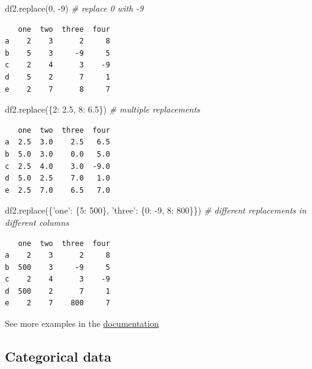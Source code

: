 \documentclass[
  letterpaper,
]{scrbook}
\newenvironment{Shaded}{\begin{snugshade}}{\end{snugshade}}
\newcommand{\CommentTok}[1]{\textcolor[rgb]{0.56,0.35,0.01}{\textit{#1}}}
\newcommand{\DecValTok}[1]{\textcolor[rgb]{0.00,0.00,0.81}{#1}}
\newcommand{\FloatTok}[1]{\textcolor[rgb]{0.00,0.00,0.81}{#1}}
\newcommand{\NormalTok}[1]{#1}
\newcommand{\StringTok}[1]{\textcolor[rgb]{0.31,0.60,0.02}{#1}}
\begin{document}
\begin{Shaded}
\begin{Highlighting}[]
\NormalTok{df2.replace(}\DecValTok{0}\NormalTok{, }\DecValTok{-9}\NormalTok{) }\CommentTok{# replace 0 with -9}
\end{Highlighting}
\end{Shaded}

\begin{verbatim}
   one  two  three  four
a    2    3      2     8
b    5    3     -9     5
c    2    4      3    -9
d    5    2      7     1
e    2    7      8     7
\end{verbatim}

\begin{Shaded}
\begin{Highlighting}[]
\NormalTok{df2.replace(\{}\DecValTok{2}\NormalTok{: }\FloatTok{2.5}\NormalTok{, }\DecValTok{8}\NormalTok{: }\FloatTok{6.5}\NormalTok{\}) }\CommentTok{# multiple replacements}
\end{Highlighting}
\end{Shaded}

\begin{verbatim}
   one  two  three  four
a  2.5  3.0    2.5   6.5
b  5.0  3.0    0.0   5.0
c  2.5  4.0    3.0  -9.0
d  5.0  2.5    7.0   1.0
e  2.5  7.0    6.5   7.0
\end{verbatim}

\begin{Shaded}
\begin{Highlighting}[]
\NormalTok{df2.replace(\{}\StringTok{'one'}\NormalTok{: \{}\DecValTok{5}\NormalTok{: }\DecValTok{500}\NormalTok{\}, }\StringTok{'three'}\NormalTok{: \{}\DecValTok{0}\NormalTok{: }\DecValTok{-9}\NormalTok{, }\DecValTok{8}\NormalTok{: }\DecValTok{800}\NormalTok{\}\}) }
\CommentTok{# different replacements in different columns}
\end{Highlighting}
\end{Shaded}

\begin{verbatim}
   one  two  three  four
a    2    3      2     8
b  500    3     -9     5
c    2    4      3    -9
d  500    2      7     1
e    2    7    800     7
\end{verbatim}

See more examples in the \href{https://pandas.pydata.org/pandas-docs/stable/reference/api/pandas.DataFrame.replace.html?highlight=replace\#pandas.DataFrame.replace}{documentation}

\hypertarget{categorical-data}{%
\subsection{Categorical data}\label{categorical-data}}
\end{document}
